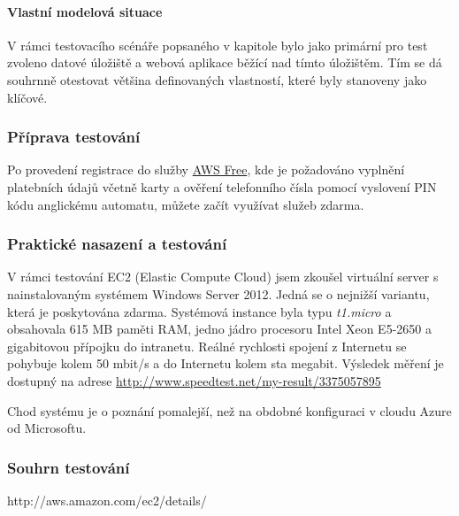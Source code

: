 \paragraph{Vlastní modelová situace}
V rámci testovacího scénáře popsaného v kapitole  bylo jako primární pro test zvoleno datové úložiště a webová aplikace běžící nad tímto úložištěm. Tím se dá souhrnně otestovat většina definovaných vlastností, které byly stanoveny jako klíčové.

\subsubsection{Příprava testování}
Po provedení registrace do služby \href{https://aws.amazon.com/free/}{AWS Free}, kde je požadováno vyplnění platebních údajů včetně karty a ověření telefonního čísla pomocí vyslovení PIN kódu anglickému automatu, můžete začít využívat služeb zdarma.

\subsubsection{Praktické nasazení a testování}
V rámci testování EC2 (Elastic Compute Cloud) jsem zkoušel virtuální server s nainstalovaným systémem Windows Server 2012. Jedná se o nejnižší variantu, která je poskytována zdarma. Systémová instance byla typu \textit{t1.micro} a obsahovala 615 MB paměti RAM, jedno jádro procesoru Intel Xeon E5-2650 a gigabitovou přípojku do intranetu. Reálné rychlosti spojení z Internetu se pohybuje kolem 50 mbit/s a do Internetu kolem sta megabit. Výsledek měření je dostupný na adrese \href{http://www.speedtest.net/my-result/3375057895}{http://www.speedtest.net/my-result/3375057895}

Chod systému je o poznání pomalejší, než na obdobné konfiguraci v cloudu Azure od Microsoftu.

\subsubsection{Souhrn testování}
http://aws.amazon.com/ec2/details/

